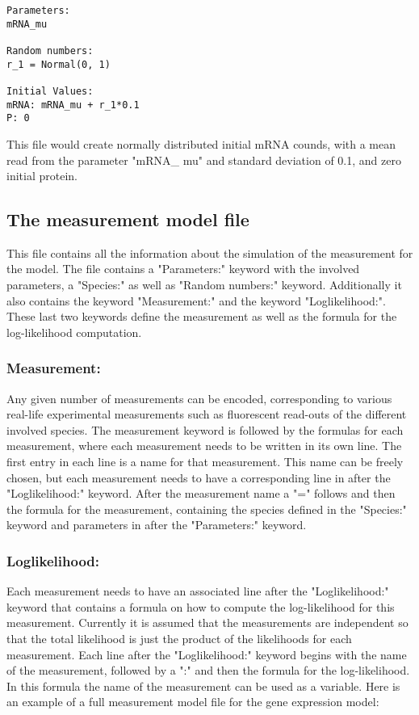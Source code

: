 \documentclass[11pt]{article} %
\begin{document}
\begin{tcolorbox}
\begin{verbatim}
Parameters:
mRNA_mu

Random numbers:
r_1 = Normal(0, 1)

Initial Values:
mRNA: mRNA_mu + r_1*0.1
P: 0
\end{verbatim}
\end{tcolorbox}

This file would create normally distributed initial mRNA counds, with a mean read from the parameter "mRNA\_ mu" and standard deviation of 0.1, and zero initial protein. 

\subsection{The measurement model file}
This file contains all the information about the simulation of the measurement for the model. The file contains a "Parameters:" keyword with the involved parameters, a "Species:" as well as "Random numbers:" keyword. Additionally it also contains the keyword "Measurement:" and the keyword "Loglikelihood:". These last two keywords define the measurement as well as the formula for the log-likelihood computation. 

\subsubsection{Measurement:}
Any given number of measurements can be encoded, corresponding to various real-life experimental measurements such as fluorescent read-outs of the different involved species. The measurement keyword is followed by the formulas for each measurement, where each measurement needs to be written in its own line. The first entry in each line is a name for that measurement. This name can be freely chosen, but each measurement needs to have a corresponding line in after the "Loglikelihood:" keyword. After the measurement name a "=" follows and then the formula for the measurement, containing the species defined in the "Species:" keyword and parameters in after the "Parameters:" keyword. 

\subsubsection{Loglikelihood:}
Each measurement needs to have an associated line after the "Loglikelihood:" keyword that contains a formula on how to compute the log-likelihood for this measurement. Currently it is assumed that the measurements are independent so that the total likelihood is just the product of the likelihoods for each measurement. Each line after the "Loglikelihood:" keyword begins with the name of the measurement, followed by a ":" and then the formula for the log-likelihood. In this formula the name of the measurement can be used as a variable. 
Here is an example of a full measurement model file for the gene expression model:
\end{document}

